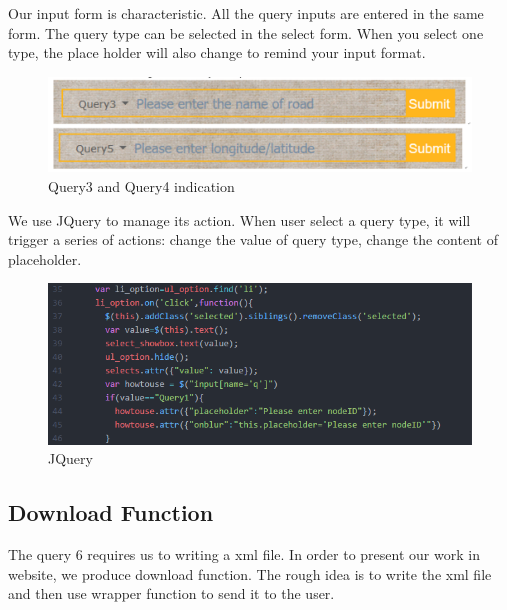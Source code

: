 \documentclass[final,1p,times]{elsarticle}
\begin{document}
Our input form is characteristic. All the query inputs are entered in the same form. The query type can be selected in the select form. When you select one type, the place holder will also change to remind your input format.

\begin{figure}[thpb]
      \centering
      \includegraphics[width=14cm]{Q3Q4.png}
      \caption{Query3 and Query4 indication}
      \label{fig:q3}
\end{figure}

We use JQuery to manage its action. When user select a query type, it will trigger a series of actions: change the value of query type, change the content of placeholder.
\begin{figure}[thpb]
      \centering
      \includegraphics[width=12cm]{Q5.png}
      \caption{JQuery}
      \label{fig:q5}
\end{figure}
\newpage
\subsection{Download Function}
The query 6 requires us to writing a xml file. In order to present our work in website, we produce download function. The rough idea is to write the xml file and then use wrapper function to send it to the user.
\end{document}
